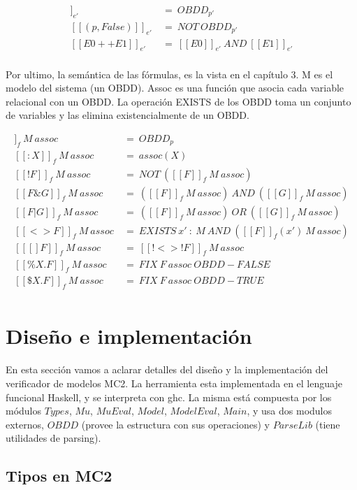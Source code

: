 \begin{align*}
[[(p,True)]]_{e'}\ &=\ OBDD_{p'} \\
[[(p,False)]]_{e'}\ &=\ NOT\ OBDD_{p'} \\
[[E0++E1]]_{e'}\ &=\ [[E0]]_{e'}\ AND\ [[E1]]_{e'} \\
\end{align*}

Por ultimo, la semántica de las fórmulas, es la vista en el capítulo 3. M es el modelo del sistema (un OBDD). Assoc es una función que asocia cada variable relacional con un OBDD. La operación EXISTS de los OBDD toma un conjunto de variables y las elimina existencialmente de un OBDD.

\begin{align*}
[[p]]_{f}\ M\ assoc\ &=\ OBDD_{p} \\
[[:X]]_{f}\ M\ assoc\ &=\ assoc(X) \\
[[!F]]_{f}\ M\ assoc\ &=\ NOT\ ([[F]]_{f}\ M\ assoc)\\
[[F \& G]]_{f}\ M\ assoc\ &=\ ([[F]]_{f}\ M\ assoc)\ AND\ ([[G]]_{f}\ M\ assoc)\\
[[F | G]]_{f}\ M\ assoc\ &=\ ([[F]]_{f}\ M\ assoc)\ OR\ ([[G]]_{f}\ M\ assoc)\\
[[<>F]]_{f}\ M\ assoc\ &=\ EXISTS\ x'\ :\ M\ AND\ ([[F]]_{f}(x')\ M\ assoc) \\
[[[]F]]_{f}\ M\ assoc\ &=\ [[!<>!F]]_{f}\ M\ assoc \\
[[\%X.F]]_{f}\ M\ assoc\ &=\ FIX\ F\ assoc\ OBDD-FALSE \\
[[\$X.F]]_{f}\ M\ assoc\ &=\ FIX\ F\ assoc\ OBDD-TRUE \\
\end{align*}

\section{Diseño e implementación}

En esta sección vamos a aclarar detalles del diseño y la implementación del verificador de modelos MC2. La herramienta esta implementada en el lenguaje funcional Haskell, y se interpreta con ghc. La misma está compuesta por los módulos $Types$, $Mu$, $MuEval$, $Model$, $ModelEval$, $Main$, y usa dos modulos externos, $OBDD$ (provee la estructura con sus operaciones) y $ParseLib$ (tiene utilidades de parsing).

\subsection{Tipos en MC2}

